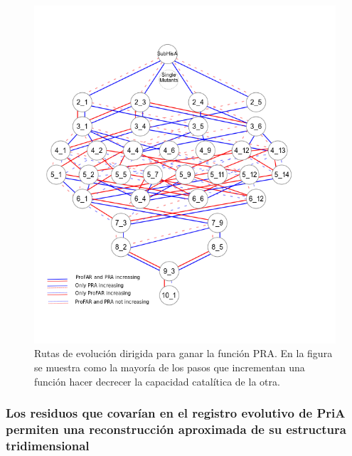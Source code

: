 \documentclass[]{article}
\begin{document}
{\begin{figure}[h!tbp]
\centering
\includegraphics[angle = 0,scale = 0.8]{chapter4/LianetFiguras/SolocirculosPRA_PRO_RUTAS_10_1_r002.png}
\caption[Positive increments on PRA]{\footnotesize{Rutas de evolución dirigida para ganar la función PRA. En la figura se muestra como la mayoría de los pasos que incrementan una función hacer decrecer la capacidad catalítica de la otra. }}
\label{fig:PRARutas}
\end{figure}

\subsubsection{Los residuos que covarían en el registro evolutivo de
PriA permiten una reconstrucción aproximada de su estructura
tridimensional}\label{los-residuos-que-covarian-en-el-registro-evolutivo-de-pria-permiten-una-reconstruccion-aproximada-de-su-estructura-tridimensional}

}
\end{document}
